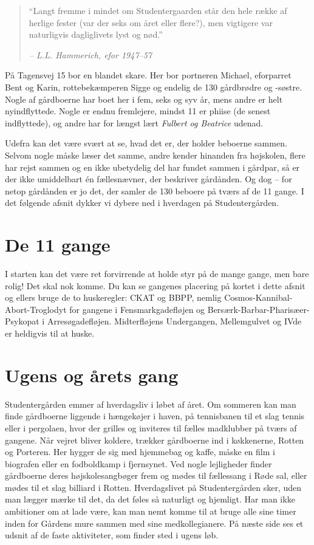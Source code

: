 \documentclass[11pt,article,twoside,openany,danish,extrafontsizes]{memoir} %
\begin{document}
\begin{quote} \small
\enquote{Langt fremme i mindet om Studentergaarden står den hele række af herlige fester (var der seks om året eller flere?), men vigtigere var naturligvis dagliglivets lyst og nød.}

\emph{-- L.L. Hammerich, efor 1947--57}
\end{quote}

\noindent
På Tagensvej 15 bor en blandet skare. Her bor portneren Michael, eforparret Bent og Karin, rottebekæmperen Sigge og endelig de 130 gårdbrødre og -søstre. Nogle af gårdboerne har boet her i fem, seks og syv år, mens andre er helt nyindflyttede. Nogle er endnu fremlejere, mindst 11 er phiise (de senest indflyttede), og andre har for længst lært \emph{Fulbert og Beatrice} udenad.

Udefra kan det være svært at se, hvad det er, der holder beboerne sammen. Selvom nogle måske læser det samme, andre kender hinanden fra højskolen, flere har rejst sammen og en ikke ubetydelig del har fundet sammen i gårdpar, så er der ikke umiddelbart én fællesnævner, der beskriver gårdånden. Og dog -- for netop gårdånden er jo det, der samler de 130 beboere på tværs af de 11 gange. I det følgende afsnit dykker vi dybere ned i hverdagen på Studentergården.


\section{De 11 gange}
I starten kan det være ret forvirrende at holde styr på de mange gange, men bare rolig! Det skal nok komme. Du kan se gangenes placering på kortet i dette afsnit og ellers bruge de to huskeregler: CKAT og BBPP, nemlig Cosmos-Kannibal-Abort-Troglodyt for gangene i Fensmarkgadefløjen og Bersærk-Barbar-Pharisæer-Psykopat i Arresøgadefløjen. Midterfløjens Undergangen, Mellemgulvet og IVde er heldigvis til at huske.





\section{Ugens og årets gang}
Studentergården emmer af hverdagsliv i løbet af året. Om sommeren kan man finde gårdboerne liggende i hængekøjer i haven, på tennisbanen til et slag tennis eller i pergolaen, hvor der grilles og inviteres til fælles madklubber på tværs af gangene. Når vejret bliver koldere, trækker gårdboerne ind i køkkenerne, Rotten og Porteren. Her hygger de sig med hjemmebag og kaffe, måske en film i biografen eller en fodboldkamp i fjernsynet. Ved nogle lejligheder finder gårdboerne deres højskolesangbøger frem og mødes til fællessang i Røde sal, eller mødes til et slag billiard i Rotten. Hverdagslivet på Studentergården sker, uden man lægger mærke til det, da det føles så naturligt og hjemligt. Har man ikke ambitioner om at lade være, kan man nemt komme til at bruge alle sine timer inden for Gårdens mure sammen med sine medkollegianere. På næste side ses et udsnit af de faste aktiviteter, som finder sted i ugens løb.
\end{document}
